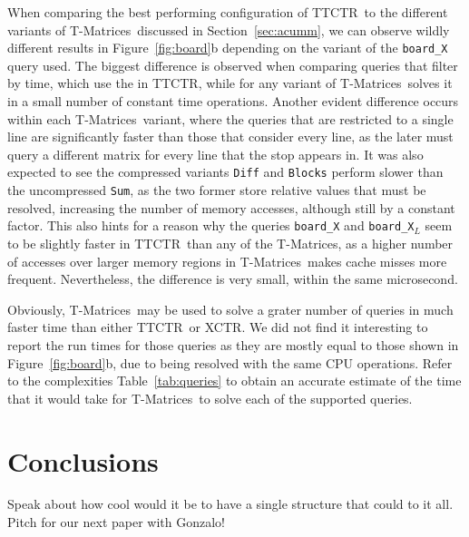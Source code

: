 \documentclass[runningheads]{llncs}
\newcommand{\acumm}{T-Matrices} %
\newcommand{\ctr}{XCTR}
\newcommand{\ttctr}{TTCTR}
\begin{document}
When comparing the best performing configuration of \ttctr~to the different variants of \acumm~discussed in Section~\ref{sec:acumm}, we can observe wildly different results in Figure~\ref{fig:board}b depending on the variant of the \texttt{board\_X} query used. The biggest difference is observed when comparing queries that filter by time, which use the  in \ttctr, while for any variant of \acumm~solves it in a small number of constant time operations. Another evident difference occurs within each \acumm~variant, where the queries that are restricted to a single line are significantly faster than those that consider every line, as the later must query a different matrix for every line that the stop appears in. It was also expected to see the compressed variants \texttt{Diff} and \texttt{Blocks} perform slower than the uncompressed \texttt{Sum}, as the two former store relative values that must be resolved, increasing the number of memory accesses, although still by a constant factor. This also hints for a reason why the queries \texttt{board\_X} and \texttt{board\_X$_{L}$} seem to be slightly faster in \ttctr~than any of the \acumm, as a higher number of accesses over larger memory regions in \acumm~makes cache misses more frequent. Nevertheless, the difference is very small, within the same microsecond.

Obviously, \acumm~may be used to solve a grater number of queries in much faster time than either \ttctr~or \ctr. We did not find it interesting to report the run times for those queries as they are mostly equal to those shown in Figure~\ref{fig:board}b, due to being resolved with the same CPU operations. Refer to the complexities Table~\ref{tab:queries} to obtain an accurate estimate of the time that it would take for \acumm~to solve each of the supported queries.


\section{Conclusions}
\label{sec:conc}
Speak about how cool would it be to have a single structure that could to it all. Pitch for our next paper with Gonzalo!

%
%





\end{document}
